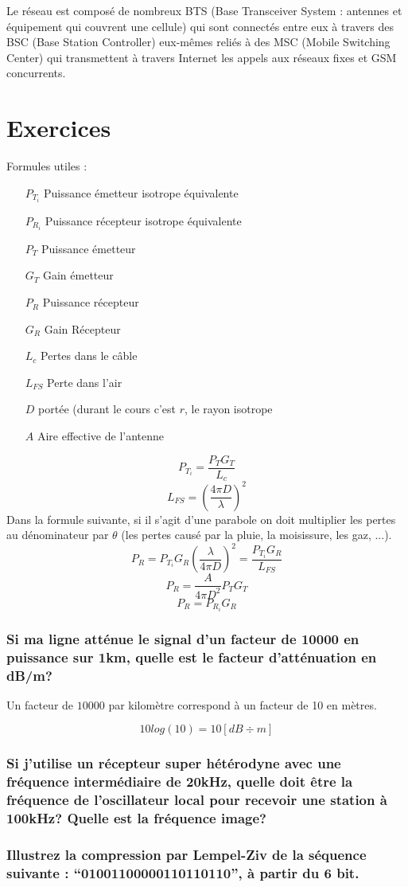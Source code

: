Le réseau est composé de nombreux BTS (Base Transceiver System : antennes et équipement qui couvrent une cellule) qui sont connectés entre eux à travers des BSC (Base Station Controller) eux-mêmes reliés à des MSC (Mobile Switching Center) qui transmettent à travers Internet les appels aux réseaux fixes et GSM concurrents.

\section{Exercices}

Formules utiles :

\begin{itemize}
\item[$P_{T_i}$] Puissance émetteur isotrope équivalente
\item[$P_{R_i}$] Puissance récepteur isotrope équivalente
\item[$P_T$] Puissance émetteur
\item[$G_T$] Gain émetteur
\item[$P_R$] Puissance récepteur
\item[$G_R$] Gain Récepteur
\item[$L_c$] Pertes dans le c\^able
\item[$L_{FS}$] Perte dans l'air
\item[$D$] portée (durant le cours c'est $r$, le rayon isotrope
\item[$A$] Aire effective de l'antenne
\end{itemize}

$$P_{T_i} = \frac{P_TG_T}{L_c}$$
$$L_{FS} = \left(\frac{4\pi D}{\lambda}\right)^2$$
Dans la formule suivante, si il s'agit d'une parabole on doit multiplier les pertes au dénominateur par $\theta$ (les pertes causé par la pluie, la moisissure, les gaz, ...).
$$P_R = P_{T_i}G_R \left(\frac{\lambda}{4\pi D}\right)^2=\frac{P_{T_i}G_R}{L_{FS}}$$
$$P_R = \frac{A}{4\pi D^2}P_TG_T$$
$$P_R = P_{R_i}G_R$$

\subsubsection*{Si ma ligne atténue le signal d'un facteur de 10000 en puissance sur 1km, quelle est le facteur d'atténuation en dB/m? } 

Un facteur de $10000$ par kilomètre correspond à un facteur de 10 en mètres.

\[ 10log(10) = 10[dB\div m] \]

\subsubsection*{Si j'utilise un récepteur super hétérodyne avec une fréquence intermédiaire de 20kHz, quelle doit être la fréquence de l'oscillateur local pour recevoir une station à 100kHz? Quelle est la fréquence image?}

\subsubsection*{Illustrez la compression par Lempel-Ziv de la séquence suivante : ``01001100000110110110'', à partir du 6 bit.}
